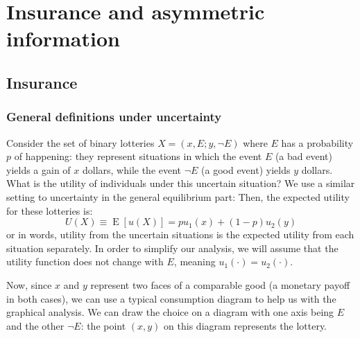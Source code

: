 \documentclass[12pt]{report}
\newcommand{\E}[1]{\operatorname{E}\left[#1\right]}
\begin{document}
\chapter{Insurance and asymmetric information}

\section{Insurance}

\subsection{General definitions under uncertainty}

Consider the set of binary lotteries $X = (x,E ; y, \neg E)$ where $E$ has a probability $p$ of happening: they represent situations in which the event $E$ (a bad event) yields a gain of $x$ dollars, while the event $\neg E$ (a good event) yields $y$ dollars. What is the utility of individuals under this uncertain situation? We use a similar setting to uncertainty in the general equilibrium part: Then, the expected utility for these lotteries is: $$U(X)\equiv \E{u(X)} = pu_1(x) + (1-p)u_2(y) $$ or in words, utility from the uncertain situations is the expected utility from each situation separately. In order to simplify our analysis, we will assume that the utility function does not change with $E$, meaning $u_1(\cdot) = u_2(\cdot)$. 

Now, since $x$ and $y$ represent two faces of a comparable good (a monetary payoff in both cases), we can use a typical consumption diagram to help us with the graphical analysis. We can draw the choice on a diagram with one axis being $E$ and the other $\neg E$: the point $(x,y)$ on this diagram represents the lottery.
\end{document}
